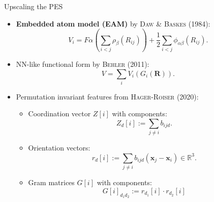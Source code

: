 \documentclass{beamer}
\newcommand\Fontvi{\fontsize{8}{7.2}\selectfont} %
\begin{document}
\begin{frame}{Upscaling the PES}
    \Fontvi
    \begin{itemize}
        \item \textbf{Embedded atom model (EAM)} by \textsc{Daw \& Baskes} (1984):
            \begin{equation}
                V_i = F\alpha\left(\sum_{i<j}\rho_\beta(R_{ij})\right)+\frac{1}{2}\sum_{i<j}\phi_{\alpha\beta}(R_{ij}).
            \end{equation}
        \item NN-like functional form by \textsc{Behler} (2011):
            \begin{equation}
                V = \sum_i V_i(G_i(\mathbf{R})).
            \end{equation}
        \item Permutation invariant features from \textsc{Hager-Roiser} (2020):
            \begin{itemize}
                \Fontvi
                \item Coordination vector $Z[i]$ with components:
                    \begin{equation}
                        Z_d[i] := \sum_{j \neq i}b_{ijd}.
                    \end{equation}
                \item Orientation vectors:
                    \begin{equation}
                        r_d[i] := \sum_{j \neq i}b_{ijd}(\mathbf{x}_j - \mathbf{x}_i) \in \mathbb{R}^3.
                    \end{equation}
                \item Gram matrices $G[i]$ with components:
                \begin{equation}
                    G[i]_{d_1d_2} := r_{d_1}[i] \cdot r_{d_2}[i]
                \end{equation}
            \end{itemize}
    \end{itemize}
\end{frame}
\end{document}

